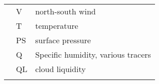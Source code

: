 \begin{longtable}[]{@{}lll@{}}
\begin{minipage}[t]{0.30\columnwidth}
\strut
\end{minipage} & \begin{minipage}[t]{0.30\columnwidth}\raggedright
V\strut
\end{minipage} & \begin{minipage}[t]{0.30\columnwidth}\raggedright
north-south wind\strut
\end{minipage}\tabularnewline
\begin{minipage}[t]{0.30\columnwidth}\raggedright
\strut
\end{minipage} & \begin{minipage}[t]{0.30\columnwidth}\raggedright
T\strut
\end{minipage} & \begin{minipage}[t]{0.30\columnwidth}\raggedright
temperature\strut
\end{minipage}\tabularnewline
\begin{minipage}[t]{0.30\columnwidth}\raggedright
\strut
\end{minipage} & \begin{minipage}[t]{0.30\columnwidth}\raggedright
PS\strut
\end{minipage} & \begin{minipage}[t]{0.30\columnwidth}\raggedright
surface pressure\strut
\end{minipage}\tabularnewline
\begin{minipage}[t]{0.30\columnwidth}\raggedright
\strut
\end{minipage} & \begin{minipage}[t]{0.30\columnwidth}\raggedright
Q\strut
\end{minipage} & \begin{minipage}[t]{0.30\columnwidth}\raggedright
Specific humidity, various tracers\strut
\end{minipage}\tabularnewline
\begin{minipage}[t]{0.30\columnwidth}\raggedright
\strut
\end{minipage} & \begin{minipage}[t]{0.30\columnwidth}\raggedright
QL\strut
\end{minipage} & \begin{minipage}[t]{0.30\columnwidth}\raggedright
cloud liquidity\strut
\end{minipage}\tabularnewline
\begin{minipage}[t]{0.30\columnwidth}\raggedright
\strut
\end{minipage} & \begin{minipage}[t]{0.30\columnwidth}\raggedright

\end{minipage}
\end{longtable}
